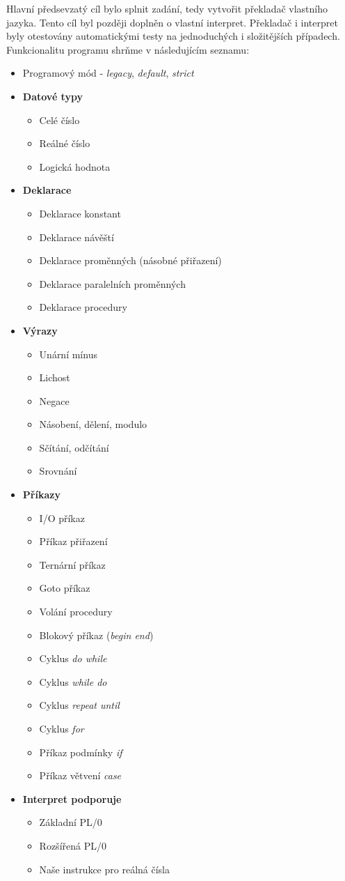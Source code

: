 \documentclass[
12pt,
a4paper,
pdftex,
czech,
titlepage
]{report}
\begin{document}
Hlavní předsevzatý cíl bylo splnit zadání, tedy vytvořit překladač vlastního jazyka. Tento cíl byl později doplněn o vlastní interpret. Překladač i interpret byly otestovány automatickými testy na jednoduchých i složitějších případech. Funkcionalitu programu shrňme v následujícím seznamu:
\begin{itemize}
\item Programový mód - \textit{legacy}, \textit{default}, \textit{strict}
\item \textbf{Datové typy}
\begin{itemize}
\item Celé číslo
\item Reálné číslo
\item Logická hodnota
\end{itemize}
\item \textbf{Deklarace}
\begin{itemize}
\item Deklarace konstant
\item Deklarace návěští
\item Deklarace proměnných (násobné přiřazení)
\item Deklarace paralelních proměnných
\item Deklarace procedury
\end{itemize}
\item \textbf{Výrazy}
\begin{itemize}
\item Unární mínus
\item Lichost
\item Negace
\item Násobení, dělení, modulo
\item Sčítání, odčítání
\item Srovnání
\end{itemize}
\item \textbf{Příkazy}
\begin{itemize}
\item I/O příkaz
\item Příkaz přiřazení
\item Ternární příkaz
\item Goto příkaz
\item Volání procedury
\item Blokový příkaz (\textit{begin end})
\item Cyklus \textit{do while}
\item Cyklus \textit{while do}
\item Cyklus \textit{repeat until}
\item Cyklus \textit{for}
\item Příkaz podmínky \textit{if}
\item Příkaz větvení \textit{case}
\end{itemize}
\item \textbf{Interpret podporuje}
\begin{itemize}
\item Základní PL/0
\item Rozšířená PL/0
\item Naše instrukce pro reálná čísla
\end{itemize}
\end{itemize}
\end{document}
